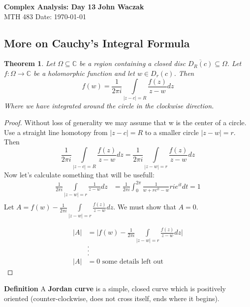\documentclass[a4paper, 11pt]{article}
\newtheorem*{theorem}{Theorem}
\begin{document}
\noindent
\large\textbf{Complex Analysis: Day 13} \hfill \textbf{John Waczak} \\
\normalsize MTH 483 \hfill  Date: \today \\

\subsection*{More on Cauchy's Integral Formula}
	\begin{theorem}
		Let $\Omega \subseteq \mathbb{C}$ be a region containing a closed disc $\overline{D_R(c)}\subseteq\Omega$. Let $f:\Omega\rightarrow\mathbb{C}$ be a holomorphic function and let $w\in D_r(c)$. Then 
			\begin{equation*}
				f(w) = \frac{1}{2\pi i}\int\limits_{|z-c|=R}\frac{f(z)}{z-w}dz
			\end{equation*}
		Where we have integrated around the circle in the clockwise direction. 
	\end{theorem} 
	
	\begin{proof}
		Without loss of generality we may assume that w is the center of a circle. Use a straight line homotopy from $|z-c|=R$ to a smaller circle $|z-w|=r$. Then 
			\begin{equation*}
				\frac{1}{2\pi i}\int\limits_{|z-c|=R}\frac{f(z)}{z-w}dz = \frac{1}{2\pi i}\int\limits_{|z-w|=r}\frac{f(z)}{z-w}dz
			\end{equation*}
		Now let's calculate something that will be usefull: 
			\begin{align*}
				\frac{1}{2\pi i}\int\limits_{|z-w|=r}\frac{1}{z-w}dz &= \frac{1}{2\pi i}\int_0^{2\pi} \frac{1}{w + re^{it}-w}rie^{it}dt = 1 \\ 
			\end{align*}
		Let $A=f(w)-\frac{1}{2\pi i}\int\limits_{|z-w|=r}\frac{f(z)}{z-w}dz$. We must show that $A=0$. 
		
		\begin{align*}
			|A| &= \Big|f(w)-\frac{1}{2\pi i}\int\limits_{|z-w|=r}\frac{f(z)}{z-w}dz\Big|\\
			&. \\ 
			&. \\
			&. \\
			|A| &= 0 \text{ some details left out} 
		\end{align*}
	\end{proof}
	
	\noindent\textbf{Definition} A \textbf{Jordan curve} is a simple, closed curve which is positively oriented (counter-clockwise, does not cross itself, ends where it begins). \\
	
\end{document}
